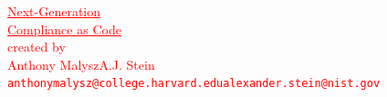 \documentclass[11pt]{article}
\begin{document}
\begin{center}
    \textcolor{red}{
    \HUGE \underline{Next-Generation} \\
    \HUGE \underline{Compliance as Code} \\
    \bigskip
    \normalsize created by \\
    \medskip
    \hspace{-2cm}\large Anthony Malysz\hspace{4.5cm}A.J. Stein \\
    \hspace{-1.7cm}\normalsize\texttt{anthonymalysz@college.harvard.edu}\hspace{1.9cm}\texttt{alexander.stein@nist.gov} \\
    }
\end{center}

\newpage
\end{document}
